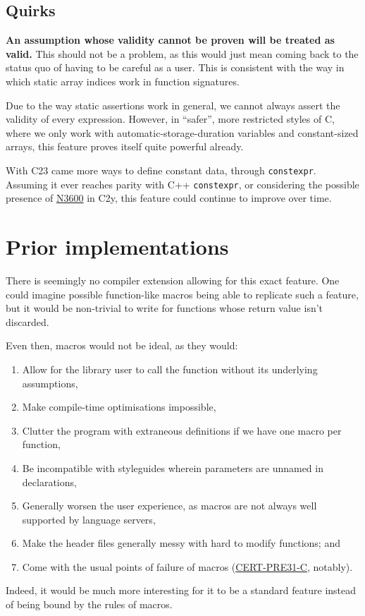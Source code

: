 \documentclass[a4paper, 12pt]{article}
\begin{document}
\subsection{Quirks}
\label{sec:org1ba83f0}
\textbf{An assumption whose validity cannot be proven will be treated as valid.}
This should not be a problem, as this would just mean coming back to the
status quo of having to be careful as a user.
This is consistent with the way in which static array indices work in
function signatures.

Due to the way static assertions work in general, we cannot always assert
the validity of every expression. However, in ``safer'', more restricted
styles of C, where we only work with automatic-storage-duration variables
and constant-sized arrays, this feature proves itself quite powerful already.

With C23 came more ways to define constant data, through \texttt{constexpr}.
Assuming it ever reaches parity with C++ \texttt{constexpr}, or considering the possible
presence of \href{https://open-std.org/jtc1/sc22/wg14/www/docs/n3600.htm}{N3600} in C2y, this feature could continue to improve over time.
\section{Prior implementations}
\label{sec:org4410275}
There is seemingly no compiler extension allowing for this exact feature.
One could imagine possible function-like macros being able to replicate such
a feature, but it would be non-trivial to write for functions whose return
value isn't discarded.

Even then, macros would not be ideal, as they would:
\begin{enumerate}
\item Allow for the library user to call the function without its underlying assumptions,
\item Make compile-time optimisations impossible,
\item Clutter the program with extraneous definitions if we have one macro per function,
\item Be incompatible with styleguides wherein parameters are unnamed in declarations,
\item Generally worsen the user experience, as macros are not always well supported
by language servers,
\item Make the header files generally messy with hard to modify functions; and
\item Come with the usual points of failure of macros (\href{https://wiki.sei.cmu.edu/confluence/display/c/PRE31-C.+Avoid+side+effects+in+arguments+to+unsafe+macros}{CERT-PRE31-C}, notably).
\end{enumerate}

Indeed, it would be much more interesting for it to be a standard feature
instead of being bound by the rules of macros.
\end{document}
